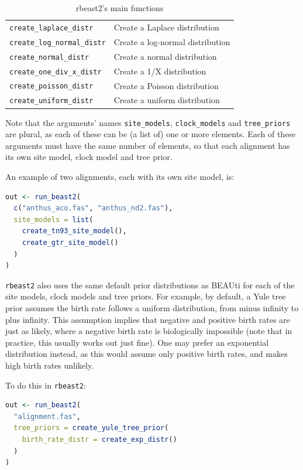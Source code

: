 \documentclass{article}
\begin{document}
\begin{table}[]
\begin{tabular}{ | l | l | }
\verb;create_laplace_distr; & Create a Laplace distribution \\
\verb;create_log_normal_distr; & Create a log-normal distribution \\
\verb;create_normal_distr; & Create a normal distribution \\
\verb;create_one_div_x_distr; & Create a 1/X distribution \\
\verb;create_poisson_distr; & Create a Poisson distribution \\
\verb;create_uniform_distr; & Create a uniform distribution \\
\hline
\end{tabular}
\caption{rbeast2's main functions}
\label{tab:functions}
\end{table}

Note that the arguments' names \verb;site_models;, \verb;clock_models; 
and \verb;tree_priors; are plural, as each of these
can be (a list of) one or more elements. Each of these arguments must 
have the same number of elements, so that each alignment has its
own site model, clock model and tree prior. 

An example of two alignments, each with its own site model, is:

\begin{lstlisting}[language=R, floatplacement=H]
out <- run_beast2(
  c("anthus_aco.fas", "anthus_nd2.fas"),
  site_models = list(
    create_tn93_site_model(), 
    create_gtr_site_model()
  )
)
\end{lstlisting}

\verb;rbeast2; also uses the same default prior distributions as BEAUti 
for each of the site models, clock models and tree priors. 
For example, by default, a Yule tree prior assumes the birth rate 
follows a uniform distribution, 
from minus infinity to plus infinity. 
This assumption implies that negative and positive birth rates are just as likely, 
where a negative birth rate is biologically impossible (note that 
in practice, this usually works out just fine).
One may prefer an exponential distribution instead, 
as this would assume only positive birth rates, 
and makes high birth rates unlikely.

To do this in \verb;rbeast2;:

\begin{lstlisting}[language=R, floatplacement=H]
out <- run_beast2(
  "alignment.fas",
  tree_priors = create_yule_tree_prior(
    birth_rate_distr = create_exp_distr()    
  )
)
\end{lstlisting}
\end{document}
